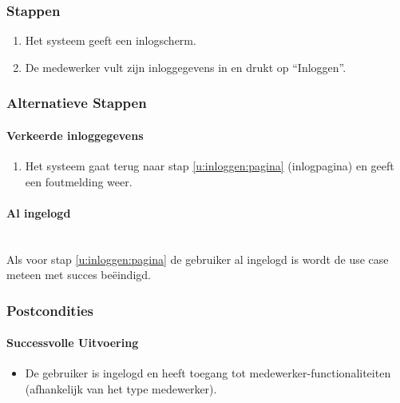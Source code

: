 \documentclass[a4paper,titlepage]{report}
\begin{document}
      \subsubsection{Stappen}
        \begin{enumerate}
          \item\label{u:inloggen:pagina} Het systeem geeft een inlogscherm.
          \item De medewerker vult zijn inloggegevens in en drukt op
          ``Inloggen''.
        \end{enumerate}
      \subsubsection{Alternatieve Stappen}
        \paragraph{Verkeerde inloggegevens}
          \begin{enumerate}
            \item Het systeem gaat terug naar stap \ref{u:inloggen:pagina}
            (inlogpagina) en geeft een foutmelding weer.
          \end{enumerate}
        \paragraph{Al ingelogd}\hfill\\
          Als voor stap \ref{u:inloggen:pagina} de gebruiker al ingelogd is
          wordt de use case meteen met succes be\"eindigd.
      \subsubsection{Postcondities}
        \paragraph{Successvolle Uitvoering}
        \begin{itemize}
          \item De gebruiker is ingelogd en heeft toegang tot
          medewerker-functionaliteiten (afhankelijk van het type medewerker).
        \end{itemize}
\end{document}
